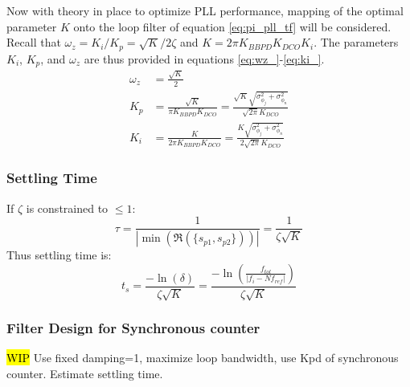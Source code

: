 			Now with theory in place to optimize PLL performance, mapping of the optimal parameter $K$ onto the loop filter of equation \ref{eq:pi_pll_tf} will be considered. Recall that $\omega_z = K_i/K_p = \sqrt{K}/2\zeta$ and $K = 2\pi K_{BBPD}K_{DCO}K_{i}$. The parameters $K_i$, $K_p$, and $\omega_z$ are thus provided in equations \ref{eq:wz_}-\ref{eq:ki_}.
			\begin{align}
				\omega_z &= \frac{\sqrt{K}}{2}\label{eq:wz_}\\
				K_p &= \frac{\sqrt{K}}{\pi K_{BBPD}K_{DCO}} = \frac{\sqrt{K}\sqrt{\sigma^2_{\phi_j} + \sigma^2_{\phi_n}}}{\sqrt{2\pi}K_{DCO}}\\
				K_i &= \frac{K}{2\pi K_{BBPD}K_{DCO}} = \frac{K\sqrt{\sigma^2_{\phi_j} + \sigma^2_{\phi_n}}}{2\sqrt{2\pi}K_{DCO}}\label{eq:ki_}
			\end{align}
	
	\FloatBarrier
	\subsubsection{Settling Time}
		If $\zeta$ is constrained to $\leq 1$:
		\begin{equation}
			\tau = \frac{1}{|\min(\Re(\{s_{p1}, s_{p2}\}))|} = \frac{1}{\zeta\sqrt{K}}
		\end{equation}
		Thus settling time is:
		\begin{equation}
			t_s = \frac{-\ln(\delta)}{\zeta\sqrt{K}} = \frac{-\ln\left(\frac{f_{tol}}{|f_i - Nf_{ref}|}\right)}{\zeta\sqrt{K}} 
		\end{equation}

		\subsubsection{Filter Design for Synchronous counter}
			\hl{WIP}
			Use fixed damping=1, maximize loop bandwidth, use Kpd of synchronous counter. Estimate settling time. 


